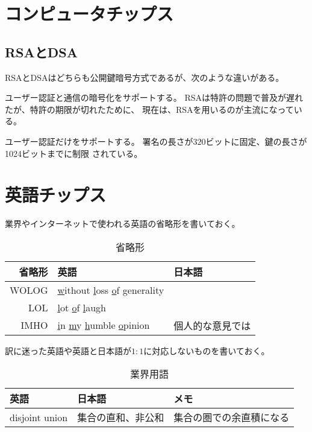 \section{コンピュータチップス}\label{s1:コンピュータチップス} %
	\subsection{RSAとDSA}\label{s2:RSAとDSA} %
		RSAとDSAはどちらも公開鍵暗号方式であるが、次のような違いがある。
		\begin{description}\setlength{\itemsep}{-1mm} %
			\item[RSA] ユーザー認証と通信の暗号化をサポートする。
			RSAは特許の問題で普及が遅れたが、特許の期限が切れたために、
			現在は、RSAを用いるのが主流になっている。
			\item[DSA] ユーザー認証だけをサポートする。
			署名の長さが$320$ビットに固定、鍵の長さが1024ビットまでに制限
			されている。
		\end{description} %
\section{英語チップス}\label{s1:英語チップス} %
	業界やインターネットで使われる英語の省略形を書いておく。
	\begin{table}[htbp] %
		\begin{center}\begin{tabular}{rll} \hline
			省略形 & 英語 & 日本語 \\ \hline
			WOLOG & \underline{w}ithout \underline{l}oss \underline{o}f
				\underline{g}enerality \\
			LOL & \underline{l}ot \underline{o}f \underline{l}augh \\
			IMHO & \underline{i}n \underline{m}y \underline{h}umble
				\underline{o}pinion & 個人的な意見では \\
		\end{tabular}\end{center}
		\caption{省略形}
	\end{table} %

	訳に迷った英語や英語と日本語が$1:1$に対応しないものを書いておく。
	\begin{table}[htbp] %
		\begin{center}\begin{tabular}{lll} \hline
			英語 & 日本語 & メモ \\ \hline
			disjoint union & 集合の直和、非公和 & 集合の圏での余直積になる \\
		\end{tabular}\end{center}
		\caption{業界用語}
	\end{table} %
